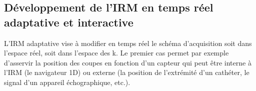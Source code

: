 
\subsection{Développement de l’IRM en temps réel adaptative et interactive}

L’IRM adaptative vise à modifier en temps réel le schéma d’acquisition soit dans l’espace réel, soit dans l’espace des k. Le premier cas permet par exemple d’asservir la position des coupes en fonction d’un capteur qui peut être interne à l’IRM (le navigateur 1D) ou externe (la position de l’extrémité d’un cathéter, le signal d’un appareil échographique, etc.).\\
